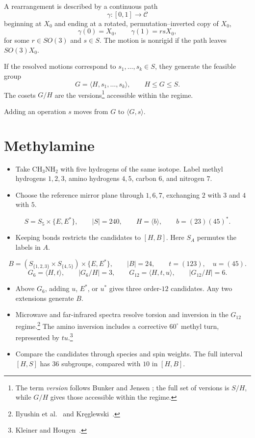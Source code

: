 \documentclass[12pt]{article}
\newcommand{\conf}{\mathcal{C}}
\begin{document}
A rearrangement is described by a continuous path
\[
\gamma:[0,1]\to\conf
\]
beginning at $X_0$ and ending at a rotated,
permutation--inverted copy of $X_0$,
\[
\gamma(0)=X_0,
\qquad
\gamma(1)=rsX_0,
\]
for some $r\in SO(3)$ and $s\in S$. The motion is
nonrigid if the path leaves $SO(3)X_0$.

If the resolved motions correspond to
$s_1,\ldots,s_k\in S$, they generate the feasible group
\[
G=\langle H,s_1,\ldots,s_k\rangle,
\qquad
H\leq G\leq S.
\]
The cosets $G/H$ are the versions\footnote{The term
\emph{version} follows Bunker and Jensen
\cite{BunkerJensen1998}; the full set of versions is $S/H$,
while $G/H$ gives those accessible within the regime.}
accessible within the regime.

Adding an operation $s$ moves from $G$ to $\langle G,s\rangle$.

\section{Methylamine}
\begin{itemize}
\item Take CH$_3$NH$_2$ with five hydrogens of the same isotope.
Label methyl hydrogens $1,2,3$, amino hydrogens $4,5$, carbon $6$, and nitrogen $7$.
\item Choose the reference mirror plane through $1,6,7$, exchanging
$2$ with $3$ and $4$ with $5$.
\end{itemize}
\[
S=S_5\times\{E,E^*\},\qquad |S|=240,
\qquad H=\langle b\rangle,\qquad b=(23)(45)^*.
\]

\begin{itemize}
\item Keeping bonds restricts the candidates to $[H,B]$.
Here $S_A$ permutes the labels in $A$.
\end{itemize}
\[
B=(S_{\{1,2,3\}}\times S_{\{4,5\}})\times\{E,E^*\},
\qquad |B|=24,
\qquad t=(123),\quad u=(45).
\]
\[
G_6=\langle H,t\rangle,\qquad |G_6/H|=3,
\qquad G_{12}=\langle H,t,u\rangle,\qquad |G_{12}/H|=6.
\]
\begin{itemize}
\item Above $G_6$, adding $u$, $E^*$, or $u^*$ gives three order-$12$
candidates. Any two extensions generate $B$.
\item Microwave and far-infrared spectra resolve torsion and inversion
in the $G_{12}$ regime.\footnote{Ilyushin et al.\
\cite{IlyushinEtAl2005} and Kr\k{e}glewski~\cite{Kreglewski2009}.}
The amino inversion includes a corrective $60^\circ$ methyl turn,
represented by $tu$.\footnote{Kleiner and Hougen~\cite{KleinerHougen2015}.}
\item Compare the candidates through species and spin weights.
The full interval $[H,S]$ has $36$ subgroups, compared with $10$ in $[H,B]$.
\end{itemize}

\end{document}
